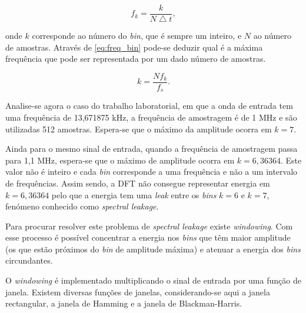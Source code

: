 \documentclass[11pt]{article}
\numberwithin{equation}{section}
\begin{document}
\vspace{-3mm}
\begin{equation}
f_{k} = \frac{k}{N \bigtriangleup t},
\label{eq:freq_bin}
\end{equation}

\vspace{1mm}
onde $k$ corresponde ao número do \textit{bin}, que é sempre um inteiro, e $N$ ao número de amostras. Através de \ref{eq:freq_bin} pode-se deduzir qual é a máxima frequência que pode ser representada por um dado número de amostras.

\vspace{-3mm}
\begin{equation}
k = \frac{N f_{k}}{f_{s}}.
\label{eq:max_bin}
\end{equation}

\vspace{1mm}
Analise-se agora o caso do trabalho laboratorial, em que a onda de entrada tem uma frequência de 13,671875 kHz, a frequência de amostragem é de 1 MHz e são utilizadas 512 amostras. Espera-se que o máximo da amplitude ocorra em $k = 7$.

Ainda para o mesmo sinal de entrada, quando a frequência de amostragem passa para 1,1 MHz, espera-se que o máximo de amplitude ocorra em $k = 6,36364$. Este valor não é inteiro  e cada \textit{bin} corresponde a uma frequência e não a um intervalo de frequências. Assim sendo, a DFT não consegue representar energia em $k = 6,36364$ pelo que a energia tem uma \textit{leak} entre os \textit{bins} $k = 6$ e $k = 7$, fenómeno conhecido como \textit{spectral leakage}.

Para procurar resolver este problema de \textit{spectral leakage} existe \textit{windowing}. Com esse processo é possível concentrar a energia nos \textit{bins} que têm maior amplitude (os que estão próximos do \textit{bin} de amplitude máxima) e atenuar a energia dos \textit{bins} circundantes.

O \textit{windowing} é implementado multiplicando o sinal de entrada por uma função de janela. Existem diversas funções de janelas, considerando-se aqui a janela rectangular, a janela de Hamming e a janela de Blackman-Harris.
\end{document}
